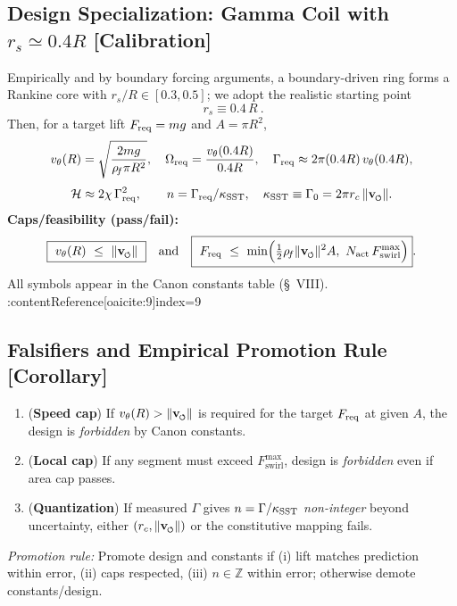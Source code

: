 \documentclass[10pt,reprint,aps,onecolumn,nofootinbib]{revtex4-2}
\newcommand{\vnorm}{\lVert \mathbf{v}_{\mkern-2mu\scriptscriptstyle\boldsymbol{\circlearrowleft}} \rVert}               %
\newcommand{\rc}{r_c}                                    %
\providecommand{\rc}{r_c}
\newcommand{\rhoF}{\rho_{\!f}}     %
\begin{document}
    \subsection{Design Specialization: Gamma Coil with $r_s\simeq 0.4R$ [Calibration]}
    \label{subsec:GammaSpec}
    Empirically and by boundary forcing arguments, a boundary-driven ring forms a Rankine core with %
    $r_s/R\in[0.3,0.5]$; we adopt the realistic starting point
    \[
        \boxed{\ r_s \equiv 0.4\,R\ }.
    \]
    Then, for a target lift $F_{\rm req}=m g$ and $A=\pi R^2$,
    \[
        v_\theta(R)=\sqrt{\frac{2 m g}{\rhoF \pi R^2}},\quad
        \Omega_{\rm req}=\frac{v_\theta(0.4R)}{0.4R},\quad
        \Gamma_{\rm req}\approx 2\pi (0.4R)\,v_\theta(0.4R),
    \]
    \[
        \mathcal{H}\approx 2\chi\,\Gamma_{\rm req}^{2},\qquad n=\Gamma_{\rm req}/\kappa_{\rm SST},\quad \kappa_{\rm SST} \equiv \Gamma_0 = 2\pi \rc\,\vnorm.
    \]
    \textbf{Caps/feasibility (pass/fail):}
    \begin{equation}
    \boxed{\ v_\theta(R)\ \le\ \vnorm\ }\quad\text{and}\quad
    \boxed{\ F_{\rm req}\ \le\ \min\!\Big(\tfrac{1}{2}\rhoF \vnorm^{2} A,\ N_{\rm act}\,F_{\text{swirl}}^{\max}\Big) }.
    \end{equation}
    All symbols appear in the Canon constants table (\S~VIII). :contentReference[oaicite:9]{index=9}

    \subsection{Falsifiers and Empirical Promotion Rule [Corollary]}
    \label{subsec:Falsifiers}
    \begin{enumerate}\itemsep4pt
    \item (\textbf{Speed cap}) If $v_\theta(R)>\vnorm$ is required for the target $F_{\rm req}$ at given $A$, the design is \emph{forbidden} by Canon constants.
    \item (\textbf{Local cap}) If any segment must exceed $F_{\text{swirl}}^{\max}$, design is \emph{forbidden} even if area cap passes.
    \item (\textbf{Quantization}) If measured $\Gamma$ gives $n=\Gamma/\kappa_{\rm SST}$ \emph{non-integer} beyond uncertainty, either $(\rc,\vnorm)$ or the constitutive mapping fails.
    \end{enumerate}
    \emph{Promotion rule:} Promote design and constants if (i) lift matches prediction within error, (ii) caps respected, (iii) $n\in\mathbb{Z}$ within error; otherwise demote constants/design.
\end{document}
